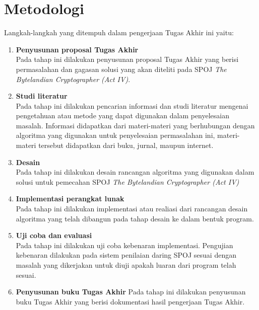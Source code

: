     
    \section{Metodologi}
    \label{metodologi}
	Langkah-langkah yang ditempuh dalam pengerjaan Tugas Akhir ini yaitu:
    \begin{enumerate}
    	\item \textbf{Penyusunan proposal Tugas Akhir} \\
		       Pada tahap ini dilakukan penyusunan proposal Tugas Akhir yang berisi permasalahan dan gagasan solusi yang akan diteliti pada SPOJ \textit{The Bytelandian Cryptographer (Act IV)}.
    	\item \textbf{Studi literatur}\\
		    	Pada tahap ini dilakukan pencarian informasi dan studi literatur mengenai pengetahuan atau metode yang dapat digunakan dalam penyelesaian masalah. Informasi didapatkan dari materi-materi yang berhubungan dengan algoritma yang digunakan untuk penyelesaian permasalahan ini, materi-materi tersebut didapatkan dari buku, jurnal, maupun internet.
    	\item \textbf{Desain}\\
		    	Pada tahap ini dilakukan desain rancangan algoritma yang digunakan dalam solusi untuk pemecahan SPOJ \textit{The Bytelandian Cryptographer (Act IV)} 
    	\item \textbf{Implementasi perangkat lunak}\\
		    	Pada tahap ini dilakukan implementasi atau realiasi dari rancangan desain algoritma yang telah dibangun pada tahap desain ke dalam bentuk program.
		 \item \textbf{Uji coba dan evaluasi}\\
		 Pada tahap ini dilakukan uji coba kebenaran implementasi. Pengujian kebenaran dilakukan pada sistem penilaian daring SPOJ sesuai dengan masalah yang dikerjakan untuk diuji apakah luaran dari program telah sesuai.
		 \item \textbf{Penyusunan buku Tugas Akhir}
		  Pada tahap ini dilakukan penyusunan buku Tugas Akhir yang berisi dokumentasi hasil pengerjaan Tugas Akhir.
	   	\end{enumerate}
	   	
